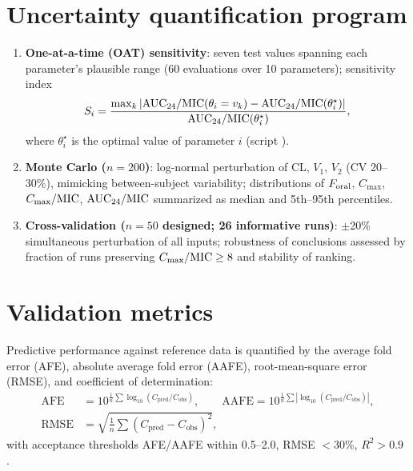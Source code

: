 \section{Uncertainty quantification program}
\label{sec:uq}
\begin{enumerate}
\item \textbf{One-at-a-time (OAT) sensitivity}: seven test values spanning each parameter's plausible range (60 evaluations over 10 parameters); sensitivity index
\begin{equation}
S_i = \frac{\max_k \left|\mathrm{AUC}_{24}/\mathrm{MIC}(\theta_i = v_k) - \mathrm{AUC}_{24}/\mathrm{MIC}(\theta_i^{\star})\right|}{\mathrm{AUC}_{24}/\mathrm{MIC}(\theta_i^{\star})},
\label{eq:sens-index}
\end{equation}
where $\theta_i^{\star}$ is the optimal value of parameter $i$ (script ).
\item \textbf{Monte Carlo ($n=200$)}: log-normal perturbation of CL, $V_1$, $V_2$ (CV 20--30\%), mimicking between-subject variability; distributions of $F_{\mathrm{oral}}$, $C_{\max}$, $C_{\max}/\mathrm{MIC}$, $\mathrm{AUC}_{24}/\mathrm{MIC}$ summarized as median and 5th--95th percentiles.
\item \textbf{Cross-validation ($n=50$ designed; 26 informative runs)}: $\pm$20\% simultaneous perturbation of all inputs; robustness of conclusions assessed by fraction of runs preserving $C_{\max}/\mathrm{MIC} \geq 8$ and stability of ranking.
\end{enumerate}

\section{Validation metrics}
Predictive performance against reference data is quantified by the average fold error (AFE), absolute average fold error (AAFE), root-mean-square error (RMSE), and coefficient of determination:
\begin{align}
\mathrm{AFE} &= 10^{\frac{1}{n}\sum \log_{10}(C_{\mathrm{pred}}/C_{\mathrm{obs}})}, \qquad
\mathrm{AAFE} = 10^{\frac{1}{n}\sum \left|\log_{10}(C_{\mathrm{pred}}/C_{\mathrm{obs}})\right|}, \nonumber\\
\mathrm{RMSE} &= \sqrt{\tfrac{1}{n}\sum \left(C_{\mathrm{pred}} - C_{\mathrm{obs}}\right)^2},
\end{align}
with acceptance thresholds AFE/AAFE within 0.5--2.0, RMSE $<$30\%, $R^2 > 0.9$ \citep{Ferreira2021}.

